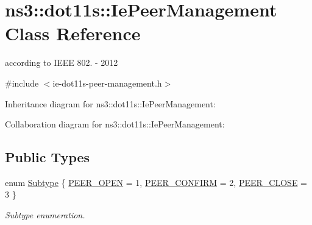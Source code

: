 \hypertarget{classns3_1_1dot11s_1_1IePeerManagement}{}\section{ns3\+:\+:dot11s\+:\+:Ie\+Peer\+Management Class Reference}
\label{classns3_1_1dot11s_1_1IePeerManagement}


according to I\+E\+EE 802. -\/ 2012  




{\ttfamily \#include $<$ie-\/dot11s-\/peer-\/management.\+h$>$}



Inheritance diagram for ns3\+:\+:dot11s\+:\+:Ie\+Peer\+Management\+:


Collaboration diagram for ns3\+:\+:dot11s\+:\+:Ie\+Peer\+Management\+:
\subsection*{Public Types}
\begin{DoxyCompactItemize}
\item 
enum \hyperlink{classns3_1_1dot11s_1_1IePeerManagement_aea0d743558aa7e6b37746e815be04b39}{Subtype} \{ \hyperlink{classns3_1_1dot11s_1_1IePeerManagement_aea0d743558aa7e6b37746e815be04b39a4b460489951879fdc4505cb1db98e55b}{P\+E\+E\+R\+\_\+\+O\+P\+EN} = 1, 
\hyperlink{classns3_1_1dot11s_1_1IePeerManagement_aea0d743558aa7e6b37746e815be04b39ac29e0c402104e97e2b0eb143722392c9}{P\+E\+E\+R\+\_\+\+C\+O\+N\+F\+I\+RM} = 2, 
\hyperlink{classns3_1_1dot11s_1_1IePeerManagement_aea0d743558aa7e6b37746e815be04b39a57ee95b16994928d34e1a153a7139ac5}{P\+E\+E\+R\+\_\+\+C\+L\+O\+SE} = 3
 \}\begin{DoxyCompactList}\small\item\em Subtype enumeration. \end{DoxyCompactList}
\end{DoxyCompactItemize}
